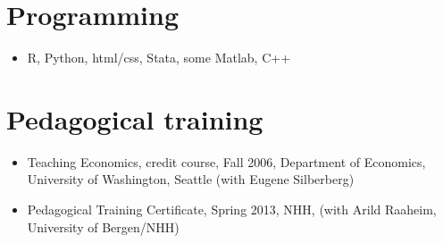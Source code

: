 \documentclass[margin]{res}
\begin{document}

\section{Programming}
\begin{itemize}
  \item[] R, Python, html/css, Stata, some Matlab, C++
\end{itemize}

\section{Pedagogical training}
\begin{itemize}
\setlength{\itemsep}{10pt}
\item[] Teaching Economics, credit course, Fall 2006, Department of Economics, University of Washington, Seattle (with Eugene Silberberg)

\item[] Pedagogical Training Certificate, Spring 2013, NHH, (with Arild Raaheim, University of Bergen/NHH)
\end{itemize}
\end{document}
